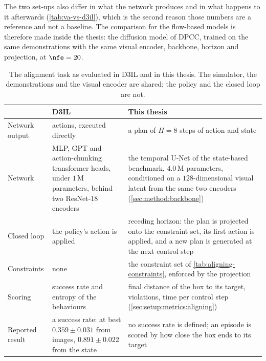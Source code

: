 The two set-ups also differ in what the network produces and in what happens to it afterwards
(\autoref{tab:va-vs-d3il}), which is the second reason those numbers are a reference and not a baseline. The comparison for the flow-based models is therefore made inside the thesis:
the diffusion model of \ac{DPCC}, trained on the same demonstrations with the same visual encoder,
backbone, horizon and projection, at $\nfe=20$.

\begin{table}[htpb]
  \caption[Alignment set-up against D3IL]{The alignment task as evaluated in D3IL and in this thesis.
  The simulator, the demonstrations and the visual encoder are shared; the policy and the closed loop are
  not.}
  \label{tab:va-vs-d3il}
  \centering
  \small
  \begin{tabularx}{\linewidth}{@{}p{2.6cm} L L@{}}
    \toprule
    & D3IL \parencite{jia2024towards} & This thesis \\
    \midrule
    Network output & actions, executed directly & a plan of $H=8$ steps of action and state \\
    \addlinespace[4pt]
    Network        & MLP, GPT and action-chunking transformer heads, under $1$\,M parameters, behind two ResNet-18 encoders & the temporal U-Net of the state-based benchmark, $4.0$\,M parameters, conditioned on a $128$-dimensional visual latent from the same two encoders (\autoref{sec:method:backbone}) \\
    \addlinespace[4pt]
    Closed loop    & the policy's action is applied & receding horizon: the plan is projected onto the constraint set, its first action is applied, and a new plan is generated at the next control step \\
    \addlinespace[4pt]
    Constraints    & none & the constraint set of \autoref{tab:aligning-constraints}, enforced by the projection \\
    \addlinespace[4pt]
    Scoring        & success rate and entropy of the behaviours & final distance of the box to its target, violations, time per control step (\autoref{sec:setup:metrics:aligning}) \\
    \addlinespace[4pt]
    Reported result & a success rate: at best $0.359 \pm 0.031$ from images, $0.891 \pm 0.022$ from the state & no success rate is defined; an episode is scored by how close the box ends to its target \\
    \bottomrule
  \end{tabularx}
\end{table}
\FloatBarrier
{}

